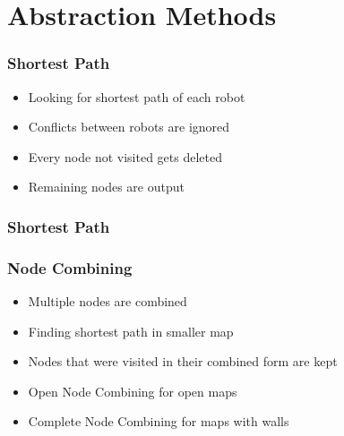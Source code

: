 \documentclass{beamer}
\begin{document}
\section{Abstraction Methods}
\begin{frame}
\frametitle{Shortest Path}
\begin{itemize}
\item<2-> Looking for shortest path of each robot
\medskip
\item<3-> Conflicts between robots are ignored
\medskip
\item<4-> Every node not visited gets deleted
\medskip
\item<5-> Remaining nodes are output
\end{itemize}
\end{frame}

\begin{frame}
\frametitle{Shortest Path}
\begin{figure}[h]
\end{figure}
\end{frame}

\begin{frame}
\frametitle{Node Combining}
\begin{itemize}
\item<2-> Multiple nodes are combined
\medskip
\item<3-> Finding shortest path in smaller map
\medskip
\item<4-> Nodes that were visited in their combined form are kept
\medskip
\item<5-> Open Node Combining for open maps
\item<6-> Complete Node Combining for maps with walls
\end{itemize}
\end{frame}
\end{document}
